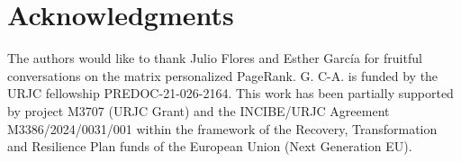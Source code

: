 \documentclass[sn-mathphys-ay]{sn-jnl}%
\theoremstyle{thmstyleone}%
\theoremstyle{thmstyletwo}%
\theoremstyle{thmstylethree}%
\begin{document}
\section*{Acknowledgments}

The authors would like to thank Julio Flores and Esther García for fruitful conversations on the matrix personalized PageRank. G. C-A. is funded by the URJC fellowship PREDOC-21-026-2164. This work has been partially supported by project M3707 (URJC Grant) and the INCIBE/URJC Agreement M3386/2024/0031/001 within the framework of
the Recovery, Transformation and Resilience Plan funds of the European Union (Next Generation EU).



%
%
%
	
	
	
	
	
	
	
	
\end{document}
